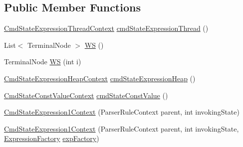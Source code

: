\subsection*{Public Member Functions}
\begin{DoxyCompactItemize}
\item 
\hyperlink{classgov_1_1nasa_1_1jpf_1_1inspector_1_1server_1_1expression_1_1parser_1_1_expression_grammar_paf34f6c6cf6d3cef851c12971caa03ed5}{Cmd\+State\+Expression\+Thread\+Context} \hyperlink{classgov_1_1nasa_1_1jpf_1_1inspector_1_1server_1_1expression_1_1parser_1_1_expression_grammar_pa1eb341e049a8047f26aa8b84266a8b94_a712a80f134919bf2dee367b1386c473f}{cmd\+State\+Expression\+Thread} ()
\item 
List$<$ Terminal\+Node $>$ \hyperlink{classgov_1_1nasa_1_1jpf_1_1inspector_1_1server_1_1expression_1_1parser_1_1_expression_grammar_pa1eb341e049a8047f26aa8b84266a8b94_a247ba43fcb025e2def9cb80b480dfb40}{WS} ()
\item 
Terminal\+Node \hyperlink{classgov_1_1nasa_1_1jpf_1_1inspector_1_1server_1_1expression_1_1parser_1_1_expression_grammar_pa1eb341e049a8047f26aa8b84266a8b94_a42d383a0b4318e9c124b94563ad7d1f1}{WS} (int i)
\item 
\hyperlink{classgov_1_1nasa_1_1jpf_1_1inspector_1_1server_1_1expression_1_1parser_1_1_expression_grammar_pa4cb3092c60a124c5db4482cce4b4fe10}{Cmd\+State\+Expression\+Heap\+Context} \hyperlink{classgov_1_1nasa_1_1jpf_1_1inspector_1_1server_1_1expression_1_1parser_1_1_expression_grammar_pa1eb341e049a8047f26aa8b84266a8b94_a0a9080a42faefc325022bd3f1b035acd}{cmd\+State\+Expression\+Heap} ()
\item 
\hyperlink{classgov_1_1nasa_1_1jpf_1_1inspector_1_1server_1_1expression_1_1parser_1_1_expression_grammar_pa618023edddc6cf63ca4452111d0560c6}{Cmd\+State\+Const\+Value\+Context} \hyperlink{classgov_1_1nasa_1_1jpf_1_1inspector_1_1server_1_1expression_1_1parser_1_1_expression_grammar_pa1eb341e049a8047f26aa8b84266a8b94_a738fcfef2ef41d9a349b87d278d2cd38}{cmd\+State\+Const\+Value} ()
\item 
\hyperlink{classgov_1_1nasa_1_1jpf_1_1inspector_1_1server_1_1expression_1_1parser_1_1_expression_grammar_pa1eb341e049a8047f26aa8b84266a8b94_aa9f26dc9099233541c5356dd999deffb}{Cmd\+State\+Expression1\+Context} (Parser\+Rule\+Context parent, int invoking\+State)
\item 
\hyperlink{classgov_1_1nasa_1_1jpf_1_1inspector_1_1server_1_1expression_1_1parser_1_1_expression_grammar_pa1eb341e049a8047f26aa8b84266a8b94_a2793d31d5411ef4eb92a8887821da468}{Cmd\+State\+Expression1\+Context} (Parser\+Rule\+Context parent, int invoking\+State, \hyperlink{classgov_1_1nasa_1_1jpf_1_1inspector_1_1server_1_1expression_1_1_expression_factory}{Expression\+Factory} \hyperlink{classgov_1_1nasa_1_1jpf_1_1inspector_1_1server_1_1expression_1_1parser_1_1_expression_grammar_pa1eb341e049a8047f26aa8b84266a8b94_ac7d1993a5ec60c1b24e986a20e2c6748}{exp\+Factory})

\end{DoxyCompactItemize}
